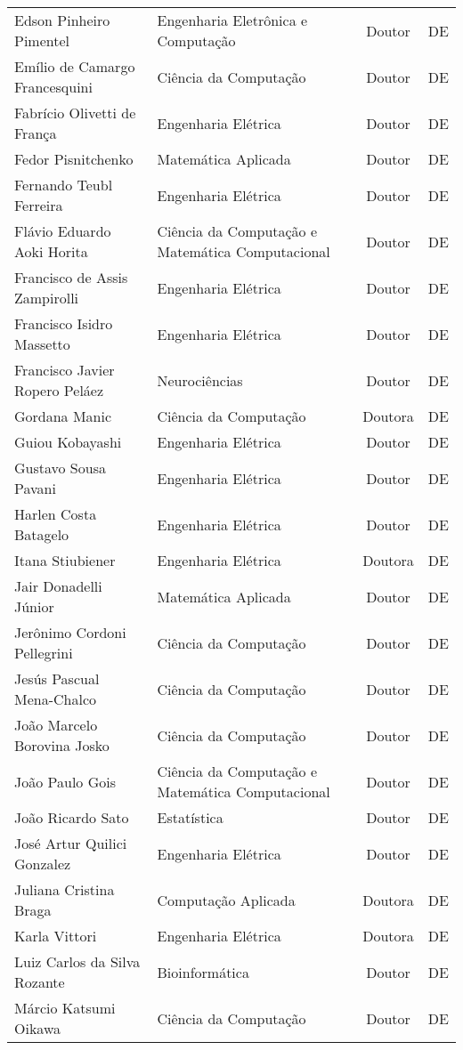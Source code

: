 \begin{longtable}{|l|l|c|c|}
	Edson Pinheiro Pimentel & Engenharia Eletrônica e Computação & Doutor & DE \\
	Emílio de Camargo Francesquini & Ciência da Computação & Doutor & DE \\
	Fabrício Olivetti de França & Engenharia Elétrica & Doutor & DE \\
	Fedor Pisnitchenko & Matemática Aplicada & Doutor & DE \\
	Fernando Teubl Ferreira & Engenharia Elétrica & Doutor & DE \\
	Flávio Eduardo Aoki Horita & Ciência da Computação e Matemática Computacional & Doutor & DE \\
	Francisco de Assis Zampirolli & Engenharia Elétrica & Doutor & DE \\
	Francisco Isidro Massetto & Engenharia Elétrica & Doutor & DE \\
	Francisco Javier Ropero Peláez & Neurociências & Doutor & DE \\
	Gordana Manic & Ciência da Computação & Doutora & DE \\
	Guiou Kobayashi & Engenharia Elétrica & Doutor & DE \\
	Gustavo Sousa Pavani & Engenharia Elétrica & Doutor & DE \\
	Harlen Costa Batagelo & Engenharia Elétrica & Doutor & DE \\
	Itana Stiubiener & Engenharia Elétrica  & Doutora & DE \\
	Jair Donadelli Júnior & Matemática Aplicada & Doutor & DE \\
	Jerônimo Cordoni Pellegrini & Ciência da Computação & Doutor & DE \\
	Jesús Pascual Mena-Chalco & Ciência da Computação & Doutor & DE \\
	João Marcelo Borovina Josko & Ciência da Computação & Doutor & DE \\
	João Paulo Gois & Ciência da Computação e Matemática Computacional & Doutor & DE \\
	João Ricardo Sato & Estatística & Doutor & DE \\
	José Artur Quilici Gonzalez & Engenharia Elétrica & Doutor & DE \\
	Juliana Cristina Braga & Computação Aplicada & Doutora & DE \\
	Karla Vittori & Engenharia Elétrica & Doutora & DE \\
	Luiz Carlos da Silva Rozante & Bioinformática & Doutor & DE \\
	Márcio Katsumi Oikawa & Ciência da Computação & Doutor & DE \\

\end{longtable}
